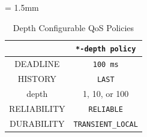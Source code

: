\documentclass{sig-alternate-05-2015}
\begin{document}
\renewcommand{\arraystretch}{1.0}
\begin{table}[t]
\caption{\label{tb:depth_qos}Depth Configurable QoS Policies}
\centering
\tabcolsep = 1.5mm              %
\begin{tabular}{c|c}
\hline
 & \textbf{\texttt{*-depth policy} }\\
\hline
\hline
DEADLINE & \texttt{100 ms}\\
HISTORY & \texttt{LAST}\\
depth & 1, 10, or 100\\
RELIABILITY & \texttt{RELIABLE}\\
DURABILITY & \texttt{TRANSIENT\_LOCAL}\\
\hline
\end{tabular}
\end{table}
\end{document}
